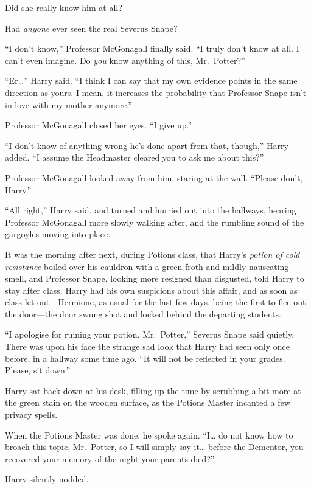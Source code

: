 Did she really know him at all?

Had \emph{anyone} ever seen the real Severus Snape?

``I don't know,'' Professor McGonagall finally said. ``I truly don't
know at all. I can't even imagine. Do \emph{you} know anything of this,
Mr.~Potter?''

``Er\ldots{}'' Harry said. ``I think I can say that my own evidence
points in the same direction as yours. I mean, it increases the
probability that Professor Snape isn't in love with my mother anymore.''

Professor McGonagall closed her eyes. ``I give up.''

``I don't know of anything wrong he's done apart from that, though,''
Harry added. ``I assume the Headmaster cleared you to ask me about
this?''

Professor McGonagall looked away from him, staring at the wall. ``Please
don't, Harry.''

``All right,'' Harry said, and turned and hurried out into the hallways,
hearing Professor McGonagall more slowly walking after, and the rumbling
sound of the gargoyles moving into place.

It was the morning after next, during Potions class, that Harry's
\emph{potion of cold resistance} boiled over his cauldron with a green
froth and mildly nauseating smell, and Professor Snape, looking more
resigned than disgusted, told Harry to stay after class. Harry had his
own suspicions about this affair, and as soon as class let
out---Hermione, as usual for the last few days, being the first to flee
out the door---the door swung shot and locked behind the departing
students.

``I apologise for ruining your potion, Mr.~Potter,'' Severus Snape said
quietly. There was upon his face the strange sad look that Harry had
seen only once before, in a hallway some time ago. ``It will not be
reflected in your grades. Please, sit down.''

Harry sat back down at his desk, filling up the time by scrubbing a bit
more at the green stain on the wooden surface, as the Potions Master
incanted a few privacy spells.

When the Potions Master was done, he spoke again. ``I\ldots{} do not
know how to broach this topic, Mr.~Potter, so I will simply say
it\ldots{} before the Dementor, you recovered your memory of the night
your parents died?''

Harry silently nodded.

